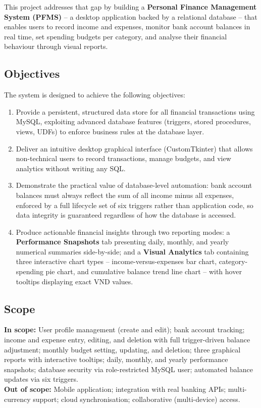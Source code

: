 \documentclass[12pt, a4paper]{article}
\begin{document}
This project addresses that gap by building a \textbf{Personal Finance Management System
(PFMS)} -- a desktop application backed by a relational database -- that enables users
to record income and expenses, monitor bank account balances in real time, set spending
budgets per category, and analyse their financial behaviour through visual reports.

\subsection{Objectives}

The system is designed to achieve the following objectives:

\begin{enumerate}[leftmargin=2em]
  \item Provide a persistent, structured data store for all financial transactions using
        MySQL, exploiting advanced database features (triggers, stored procedures, views,
        UDFs) to enforce business rules at the database layer.
  \item Deliver an intuitive desktop graphical interface (CustomTkinter) that allows
        non-technical users to record transactions, manage budgets, and view analytics
        without writing any SQL.
  \item Demonstrate the practical value of database-level automation: bank account
        balances must always reflect the sum of all income minus all expenses, enforced
        by a full lifecycle set of six triggers rather than application code, so data
        integrity is guaranteed regardless of how the database is accessed.
  \item Produce actionable financial insights through two reporting modes: a
        \textbf{Performance Snapshots} tab presenting daily, monthly, and yearly
        numerical summaries side-by-side; and a \textbf{Visual Analytics} tab
        containing three interactive chart types -- income-versus-expenses bar chart,
        category-spending pie chart, and cumulative balance trend line chart -- with
        hover tooltips displaying exact VND values.
\end{enumerate}

\subsection{Scope}

\begin{infobox}
\textbf{In scope:} User profile management (create and edit); bank account tracking;
income and expense entry, editing, and deletion with full trigger-driven balance
adjustment; monthly budget setting, updating, and deletion; three graphical reports
with interactive tooltips; daily, monthly, and yearly performance snapshots; database
security via role-restricted MySQL user; automated balance updates via six triggers.\\[0.5em]
\textbf{Out of scope:} Mobile application; integration with real banking APIs;
multi-currency support; cloud synchronisation; collaborative (multi-device) access.
\end{infobox}
\end{document}
